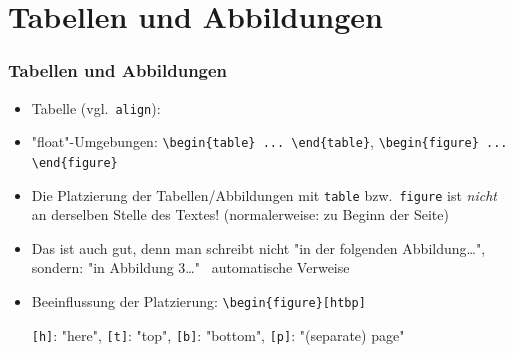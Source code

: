 \section{Tabellen und Abbildungen}

\begin{frame}[<+->][fragile]
	\frametitle{Tabellen und Abbildungen}
	\begin{itemize}
		\item Tabelle (vgl.\ \lstinline!align!):
		
		\item "float"-Umgebungen: \lstinline!\begin{table} ... \end{table}!, \lstinline!\begin{figure} ... \end{figure}!
		\item Die Platzierung der Tabellen/Abbildungen mit \lstinline!table! bzw.\ \lstinline!figure! ist \emph{nicht} an derselben Stelle des Textes! (normalerweise: zu Beginn der Seite)
		\item Das ist auch gut, denn man schreibt nicht "in der folgenden Abbildung\dots", sondern: "in Abbildung 3\dots" \textrightarrow\ automatische Verweise
		\item Beeinflussung der Platzierung: \lstinline!\begin{figure}[htbp]!
		
		\lstinline![h]!: "here", \lstinline![t]!: "top", \lstinline![b]!: "bottom", \lstinline![p]!: "(separate) page"
	\end{itemize}
\end{frame}


